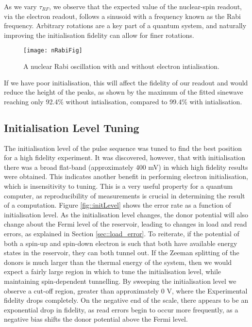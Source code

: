 	As we vary $\tau_{RF}$, we observe that the expected value of the nuclear-spin readout, via the electron readout, follows a sinusoid with a frequency known as the Rabi frequency. Arbitrary rotations are a key part of a quantum system, and naturally improving the initialisation fidelity can allow for finer rotations.
	
	\begin{figure}[H]
		\centering
		\texttt{[image: nRabiFig]}
		\caption{A nuclear Rabi oscillation with and without electron intialisation.}
		\label{fig::nuclear_rabi}
	\end{figure}
	
	If we have poor initialisation, this will affect the fidelity of our readout and would reduce the height of the peaks, as shown by the maximum of the fitted sinewave reaching only 92.4\% without intialisation, compared to 99.4\% with intialisation.

\subsection{Initialisation Level Tuning}
	The initialisation level of the pulse sequence was tuned to find the best position for a high fidelity experiment. It was discovered, however, that with initialisation there was a broad  flat-band (approximately 400 mV) in which high fidelity results were obtained. This indicates another benefit in performing electron initialisation, which is insensitivity to tuning. This is a very useful property for a quantum computer, as reproducibility of measurements is crucial in determining the result of a computation.
	Figure \ref{fig::initLevel} shows the error rate as a function of initialisation level. As the initialisation level changes, the donor potential will also change about the Fermi level of the reservoir, leading to changes in load and read errors, as explained in Section \ref{sec::load_error}. To reiterate, if the potential of both a spin-up and spin-down electron is such that both have available energy states in the reservoir, they can both tunnel out. If the Zeeman splitting of the donors is much larger than the thermal energy of the system, then we would expect a fairly large region in which to tune the initialisation level, while maintaining spin-dependent tunnelling. 
	By sweeping the initialisation level we observe a cut-off region, greater than approximately 0 V, where the Experimental fidelity drops completely. On the negative end of the scale, there appears to be an exponential drop in fidelity, as read errors begin to occur more frequently, as a negative bias shifts the donor potential above the Fermi level.
	
